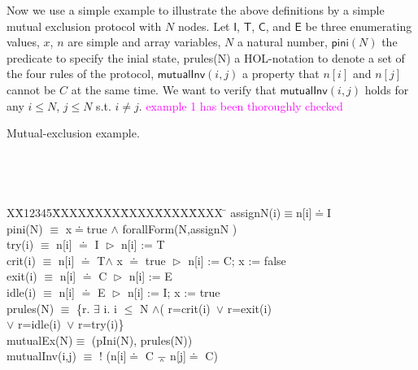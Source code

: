 \documentclass[conference]{IEEEtran}
\newlength{\fminilength}
\newenvironment{fmini}[1][\linewidth]
  {\setlength{\fminilength}{#1\fboxsep-2\fboxrule}%
   \vspace{2ex}\noindent\begin{lrbox}{\fminibox}\begin{minipage}{\fminilength}%
   \mbox{ }\hfill\vspace{-2.5ex}}%
  {\end{minipage}\end{lrbox}\vspace{1ex}\hspace{0ex}%
   \framebox{\usebox{\fminibox}}}
\newenvironment{specification}
{\noindent\scriptsize
\tt\begin{fmini}\begin{tabbing}X\=X12345\=XXXX\=XXXX\=XXXX\=XXXX\=XXXX
\=\+\kill} {\end{tabbing}\normalfont\end{fmini}}
\def \eqc {\doteq }
\def \andc {\barwedge }
\def \negc {!}
\newcommand\lyj[1]{\textcolor{magenta}{ #1}}
\begin{document}
Now we use a simple example to illustrate the above definitions by a simple mutual exclusion protocol with $N$ nodes. Let $\mathsf{I}$, $\mathsf{T}$,
 $\mathsf{C}$, and  $\mathsf{E}$  be three enumerating values, $x$,    $n$ are  simple and array variables, $N$ a natural number,  $\mathsf{pini}(N)$   the predicate to specify the inial state, prules(N) a HOL-notation to denote a set of the four rules of the protocol, $\mathsf{mutualInv}(i,j)$ a property that $n[i]$ and $ n[j]$ cannot be $C$ at the same time. We want to verify that $\mathsf{mutualInv}(i,j)$ holds for any $i\le N$, $j \le N$ s.t. $i \neq j$.
\vspace{-0.3cm}
\lyj{example 1 has been thoroughly checked}
\begin{example}\label{example1}Mutual-exclusion example.

\begin{specification}
assignN(i)$\equiv$n[i]$\eqc$I\\
 pini(N) $\equiv$
   x$\eqc$true $\wedge$  forallForm(N,assignN )\\

    try(i) $\equiv$ n[i] $\eqc$ I $\vartriangleright$ n[i] := T \\

    crit(i) $\equiv$ n[i] $\eqc$ T$\wedge$ x $\eqc$ true $\vartriangleright$  n[i] := C; x := false\\

%
   exit(i) $\equiv$ n[i] $\eqc$ C $\vartriangleright$ n[i] := E \\


   idle(i) $\equiv$  n[i] $\eqc$ E $\vartriangleright$ n[i] := I;  x := true
  \\%
   prules(N) $\equiv$ \{r. $\exists$ i. i $\le$ N $\wedge$( r=crit(i)~$\vee$ r=exit(i) \\
    $\vee$ r=idle(i)~$\vee$ r=try(i)\}\\

mutualEx(N)$\equiv$ (pIni(N), prules(N))\\

mutualInv(i,j) $\equiv$
  $\negc$ (n[i]$\eqc$ C $\andc$ n[j]$\eqc$ C)\\



\end{specification}
\end{example}
\end{document}
